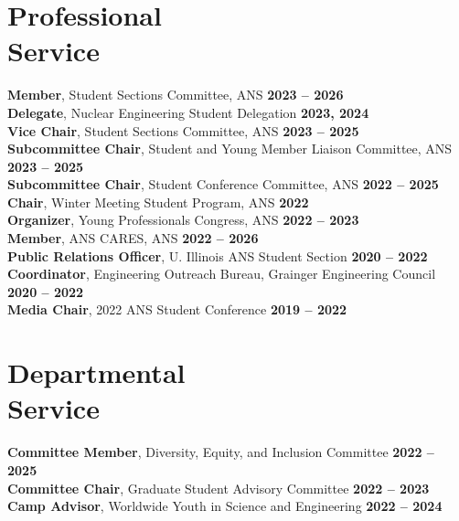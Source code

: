 \documentclass[margin,line]{resume}
\begin{document}
\begin{resume}
    \section{\mysidestyle Professional\\Service}
    \textbf{Member}, Student Sections Committee, ANS \hfill \textbf{2023 -- 2026}\vspace{.5mm}\\%
    \textbf{Delegate}, Nuclear Engineering Student Delegation \hfill \textbf{2023, 2024}\vspace{.5mm}\\%
    \textbf{Vice Chair}, Student Sections Committee, ANS \hfill \textbf{2023 -- 2025}\vspace{.5mm}\\%
    \textbf{Subcommittee Chair}, Student and Young Member Liaison Committee, ANS \hfill \textbf{2023 -- 2025}\vspace{.5mm}\\%
    \textbf{Subcommittee Chair}, Student Conference Committee, ANS \hfill \textbf{2022 -- 2025}\vspace{.5mm}\\%
    \textbf{Chair}, Winter Meeting Student Program, ANS \hfill \textbf{2022}\vspace{.5mm}\\%
    \textbf{Organizer}, Young Professionals Congress, ANS \hfill \textbf{2022 -- 2023}\vspace{.5mm}\\%
    \textbf{Member}, ANS CARES, ANS \hfill \textbf{2022 -- 2026}\vspace{.5mm}\\%
    \textbf{Public Relations Officer}, U. Illinois ANS Student Section  \hfill \textbf{2020 -- 2022}\vspace{.5mm}\\%
    \textbf{Coordinator}, Engineering Outreach Bureau, Grainger Engineering Council \hfill \textbf{2020 -- 2022}\vspace{.5mm}\\%
    \textbf{Media Chair}, 2022 ANS Student Conference \hfill \textbf{2019 -- 2022}\vspace{.5mm}\\%
    \section{\mysidestyle Departmental\\Service}
                \textbf{Committee Member}, Diversity, Equity, and Inclusion Committee \hfill \textbf{2022 -- 2025}\vspace{.5mm}\\%
                \textbf{Committee Chair}, Graduate Student Advisory Committee \hfill \textbf{2022 -- 2023}\vspace{.5mm}\\%
                \textbf{Camp Advisor}, Worldwide Youth in Science and Engineering \hfill \textbf{2022 -- 2024}\vspace{.5mm}\\%


\end{resume}
\end{document}
